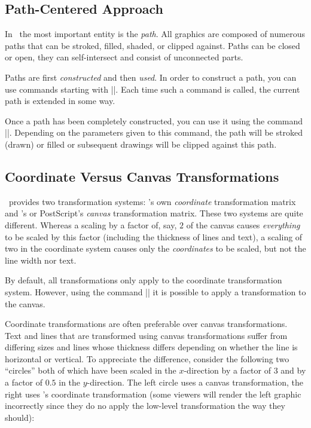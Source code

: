 \subsection{Path-Centered Approach}

In \pgfname\ the most important entity is the \emph{path}. All graphics are
composed of numerous paths that can be stroked, filled, shaded, or clipped
against. Paths can be closed or open, they can self-intersect and consist of
unconnected parts.

Paths are first \emph{constructed} and then \emph{used}. In order to construct
a path, you can use commands starting with |\pgfpath|. Each time such a command
is called, the current path is extended in some way.

Once a path has been completely constructed, you can use it using the command
|\pgfusepath|. Depending on the parameters given to this command, the path will
be stroked (drawn) or filled or subsequent drawings will be clipped against
this path.


\subsection{Coordinate Versus Canvas Transformations}
\label{section-design-transformations}

\pgfname\ provides two transformation systems: \pgfname's own \emph{coordinate}
transformation matrix and \pdf's or PostScript's \emph{canvas} transformation
matrix. These two systems are quite different. Whereas a scaling by a factor
of, say, $2$ of the canvas causes \emph{everything} to be scaled by this factor
(including the thickness of lines and text), a scaling of two in the coordinate
system causes only the \emph{coordinates} to be scaled, but not the line width
nor text.

By default, all transformations only apply to the coordinate transformation
system. However, using the command |\pgflowlevel| it is possible to apply a
transformation to the canvas.

Coordinate transformations are often preferable over canvas transformations.
Text and lines that are transformed using canvas transformations suffer from
differing sizes and lines whose thickness differs depending on whether the line
is horizontal or vertical. To appreciate the difference, consider the following
two ``circles'' both of which have been scaled in the $x$-direction by a factor
of $3$ and by a factor of $0.5$ in the $y$-direction. The left circle uses a
canvas transformation, the right uses \pgfname's coordinate transformation
(some viewers will render the left graphic incorrectly since they do no apply
the low-level transformation the way they should):

